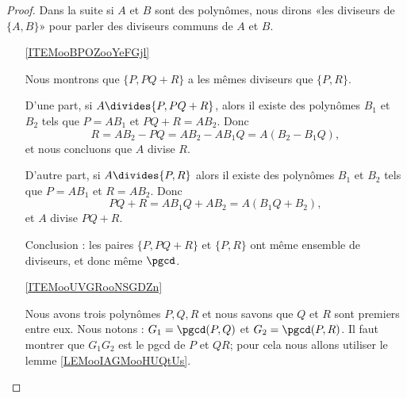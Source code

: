 \begin{proof}
    Dans la suite si \( A\) et \( B\) sont des polynômes, nous dirons «les diviseurs de \( \{ A,B \}\)» pour parler des diviseurs communs de \( A\) et \( B\).

    \begin{enumerate}
        \item[\ref{ITEMooBPOZooYeFGjl}]
            
    Nous montrons que \( \{ P,PQ+R \}\) a les mêmes diviseurs que \( \{ P,R \}\).

    D'une part, si \( A\divides\{ P,PQ+R \}\), alors il existe des polynômes \( B_1\) et \( B_2\) tels que \( P=AB_1\) et \( PQ+R=AB_2\). Donc
            \begin{equation}
                R=AB_2-PQ=AB_2-AB_1Q=A(B_2-B_1Q),
            \end{equation}
            et nous concluons que \( A\) divise \( R\).

            D'autre part, si \( A\divides\{ P,R \}\) alors il existe des polynômes \( B_1\) et \( B_2\) tels que \( P=AB_1\) et \( R=AB_2\). Donc
            \begin{equation}
                PQ+R=AB_1Q+AB_2=A(B_1Q+B_2),
            \end{equation}
            et \( A\) divise \( PQ+R\).

            Conclusion : les paires \( \{ P,PQ+R \}\) et \( \{ P,R \}\) ont même ensemble de diviseurs, et donc même \( \pgcd\).

        \item[\ref{ITEMooUVGRooNSGDZn}]

            Nous avons trois polynômes $P,Q,R$ et nous savons que $Q$ et $R$ sont premiers entre eux. Nous notons : $G_1=\pgcd(P,Q)$ et $G_2=\pgcd(P,R)$.  Il faut montrer que $G_1G_2$ est le pgcd de $P$ et $QR$; pour cela nous allons utiliser le lemme \ref{LEMooIAGMooHUQtUs}.

\end{enumerate}
\end{proof}
